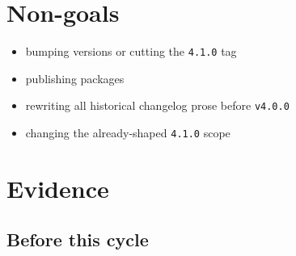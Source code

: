 \section{Non-goals}\label{record-204-non-goals}

\begin{itemize}
\tightlist
\item
  bumping versions or cutting the \texttt{4\allowbreak{}.\allowbreak{}1\allowbreak{}.\allowbreak{}0} tag
\item
  publishing packages
\item
  rewriting all historical changelog prose before \texttt{v\allowbreak{}4\allowbreak{}.\allowbreak{}0\allowbreak{}.\allowbreak{}0}
\item
  changing the already-shaped \texttt{4\allowbreak{}.\allowbreak{}1\allowbreak{}.\allowbreak{}0} scope
\end{itemize}

\section{Evidence}\label{record-204-evidence}

\subsection{Before this cycle}\label{record-204-before-this-cycle}

